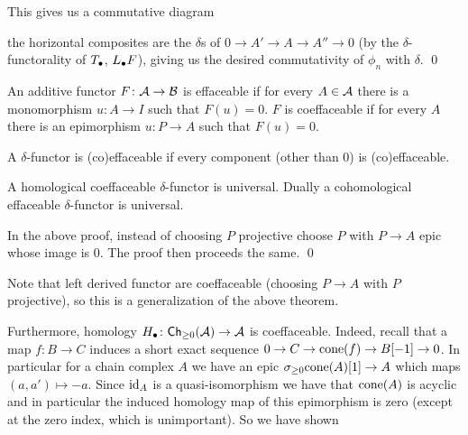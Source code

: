     This gives us a commutative diagram

    \centerline{}

    the horizontal composites are the $\delta$s of $0\to A'\to A\to A''\to0$ (by the $\delta$-functorality of $T_\bullet$, $L_\bullet F$), giving us the desired commutativity of $\phi_n$ with $\delta$.
    \qed

\eproof

\bdefn

    An additive functor $F\colon{{\cal A}}\to{{\cal B}}$ is {\emphcolor effaceable} if for every $A\in{{\cal A}}$ there is a monomorphism $u\colon A\to I$ such that $F(u)=0$.
    $F$ is {\emphcolor coeffaceable} if for every $A$ there is an epimorphism $u\colon P\to A$ such that $F(u)=0$.

    A $\delta$-functor is (co)effaceable if every component (other than $0$) is (co)effaceable.

\edefn

\bthrm

    A homological coeffaceable $\delta$-functor is universal.
    Dually a cohomological effaceable $\delta$-functor is universal.

\ethrm

\bproof

    In the above proof, instead of choosing $P$ projective choose $P$ with $P\to A$ epic whose image is $0$.
    The proof then proceeds the same.
    \qed

\eproof

Note that left derived functor are coeffaceable (choosing $P\to A$ with $P$ projective), so this is a generalization of the above theorem.

Furthermore, homology $H_\bullet\colon{\sf Ch}_{\geq0}({{\cal A}})\to{{\cal A}}$ is coeffaceable.
Indeed, recall that a map $f\colon B\to C$ induces a short exact sequence $0\to C\to{\rm cone}(f)\to B[-1]\to0$.
In particular for a chain complex $A$ we have an epic $\sigma_{\geq0}{\rm cone}(A)[1]\to A$ which maps $(a,a')\mapsto-a$.
Since ${\rm id}_A$ is a quasi-isomorphism we have that ${\rm cone}(A)$ is acyclic and in particular the induced homology map of this epimorphism is zero (except at the zero index, which is unimportant).
So we have shown

